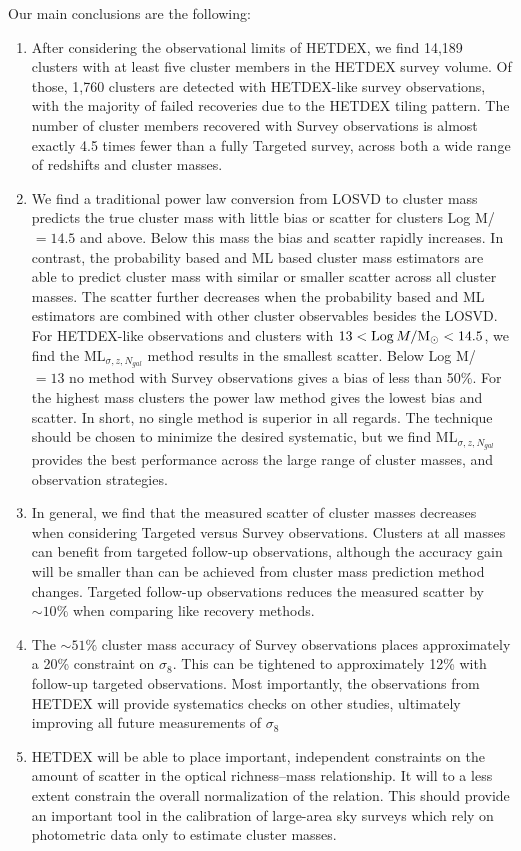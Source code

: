 \documentclass[fleqn,usenatbib]{mnras}
\begin{document}
Our main conclusions are the following:
\begin{enumerate}
	\item After considering the observational limits of HETDEX, we find 14,189 clusters with at least five cluster members in the HETDEX survey volume. Of those, 1,760 clusters are detected with HETDEX-like survey observations, with the majority of failed recoveries due to the HETDEX tiling pattern. The number of cluster members recovered with Survey observations is almost exactly 4.5 times fewer than a fully Targeted survey, across both a wide range of redshifts and cluster masses.

	\item We find a traditional power law conversion from LOSVD to cluster mass predicts the true cluster mass with little bias or scatter for clusters Log M/\Msol\ $=14.5$ and above. Below this mass the bias and scatter rapidly increases. In contrast, the probability based and ML based cluster mass estimators are able to predict cluster mass with similar or smaller scatter across all cluster masses. The scatter further decreases when the probability based and ML estimators are combined with other cluster observables besides the LOSVD. For HETDEX-like observations and clusters with $13 < \mathrm{Log}\, M/\hbox{$\mathrm{M}_\odot$} <14.5$, we find the $\mathrm{ML}_{\sigma, z, N_{gal}}$ method results in the smallest scatter. Below Log M/\Msol\ $=13$ no method with Survey observations gives a bias of less than 50\%. For the highest mass clusters the power law method gives the lowest bias and scatter. In short, no single method is superior in all regards. The technique should be chosen to minimize the desired systematic, but we find $\mathrm{ML}_{\sigma, z, N_{gal}}$ provides the best performance across the large range of cluster masses, and observation strategies.

	\item In general, we find that the measured scatter of cluster masses decreases when considering Targeted versus Survey observations. Clusters at all masses can benefit from targeted follow-up observations, although the accuracy gain will be smaller than can be achieved from cluster mass prediction method changes. Targeted follow-up observations reduces the measured scatter by $\sim10\%$ when comparing like recovery methods.

	\item The $\sim51\%$ cluster mass accuracy of Survey observations places approximately a 20\% constraint on $\sigma_8$. This can be tightened to approximately 12\% with follow-up targeted observations. Most importantly, the observations from HETDEX will provide systematics checks on other studies, ultimately improving all future measurements of $\sigma_8$

	\item HETDEX will be able to place important, independent constraints on the amount of scatter in the optical richness--mass relationship. It will to a less extent constrain the overall normalization of the relation. This should provide an important tool in the calibration of large-area sky surveys which rely on photometric data only to estimate cluster masses.
\end{enumerate}
\end{document}
